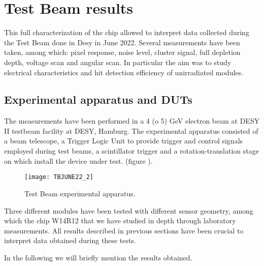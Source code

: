 \section{Test Beam results}

This full characterization of the chip allowed to interpret data collected during the Test Beam done in Desy in June 2022. Several measurements have been taken, among which: pixel response, noise level, cluster signal, full depletion depth, voltage scan and angular scan. In particular the aim was to study electrical characteristics and hit detection efficiency of unirradiated modules.



\subsection{Experimental apparatus and DUTs }

The measurements have been performed in a 4 (o 5) GeV electron beam at DESY II testbeam facility at DESY, Hamburg. The experimental apparatus consisted of a beam telescope, a Trigger Logic Unit to provide trigger and control signals employed during test beams, a scintillator trigger and a rotation-translation stage on which install the device under test. (figure ).

\begin{figure}[h!]
\centering
\texttt{[image: TBJUNE22\_2]}
\caption{Test Beam experimental apparatus.}
\label{fig:tb}
\end{figure}



\begin{comment}
\begin{figure}[h!]
\centering
\subfigure[Test beam apparatus.]
{\texttt{[image: TBJUNE22\_PHOTO]}}\quad
\subfigure[Test beam schematics.]
{\texttt{[image: TBJUNE22]}}\\
\caption{Test Beam setting at DESY.}
\label{fig:tb}
\end{figure}
\end{comment}

Three different modules have been tested with different sensor geometry, among which the chip W14R12 that we have studied in depth through laboratory measurements. All results described in previous sections have been crucial to interpret data obtained during these tests.

In the following we will briefly mention the results obtained.


